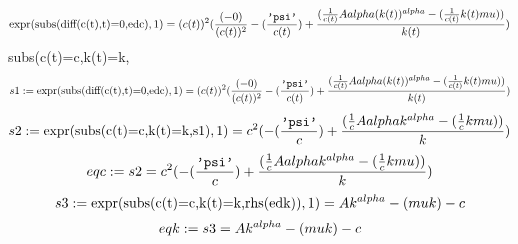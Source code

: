 \documentclass{article}
\begin{document}
\begin{equation} \label{eq:26}
\mbox{expr}(\mbox{subs(diff(c(t),t)=0,edc)},1) = (c(t))^{2}\* (\frac{(-0)}{(c(t))^{2}}-(\frac{\mbox{\tt'psi'}}{c(t)})+\frac{(\frac{1}{c(t)} \* A\* alpha\* (k(t))^{alpha}-(\frac{1}{c(t)} \* k(t)\* mu))}{k(t)})
\end{equation}
subs(c(t)=c,k(t)=k,%
\begin{equation} \label{eq:28}
s1:=\mbox{expr}(\mbox{subs(diff(c(t),t)=0,edc)},1) = (c(t))^{2}\* (\frac{(-0)}{(c(t))^{2}}-(\frac{\mbox{\tt'psi'}}{c(t)})+\frac{(\frac{1}{c(t)} \* A\* alpha\* (k(t))^{alpha}-(\frac{1}{c(t)} \* k(t)\* mu))}{k(t)})
\end{equation}
\begin{equation} \label{eq:29}
s2:=\mbox{expr}(\mbox{subs(c(t)=c,k(t)=k,s1)},1) = c^{2}\* (-(\frac{\mbox{\tt'psi'}}{c})+\frac{(\frac{1}{c} \* A\* alpha\* k^{alpha}-(\frac{1}{c} \* k\* mu))}{k})
\end{equation}
\begin{equation} \label{eq:30}
eqc:=s2 = c^{2}\* (-(\frac{\mbox{\tt'psi'}}{c})+\frac{(\frac{1}{c} \* A\* alpha\* k^{alpha}-(\frac{1}{c} \* k\* mu))}{k})
\end{equation}
\begin{equation} \label{eq:31}
s3:=\mbox{expr}(\mbox{subs(c(t)=c,k(t)=k,rhs(edk))},1) = A\* k^{alpha}-(mu\* k)-c
\end{equation}
\begin{equation} \label{eq:32}
eqk:=s3 = A\* k^{alpha}-(mu\* k)-c
\end{equation}
\end{document}
